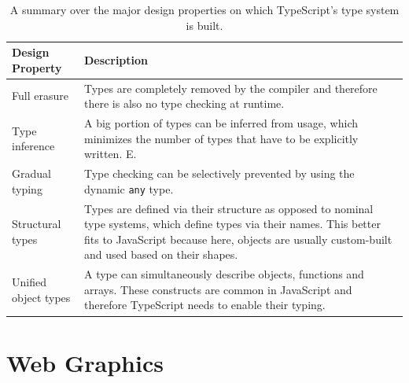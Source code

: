 \begin{table}[tp]
    \centering
    \begin{tabularx}{\linewidth}{| l | X |}
        \hline
        \textbf{Design Property} & \textbf{Description}                                                                                                                                                                                                        \\ \hline
        Full erasure             & Types are completely removed by the compiler and therefore there is also no type checking at runtime.                                                                                                                       \\ \hline
        Type inference           & A big portion of types can be inferred from usage, which minimizes the number of types that have to be explicitly written. E.                                                                                               \\ \hline
        Gradual typing           & Type checking can be selectively prevented by using the dynamic \lstinline{any} type.                                                                                                                                       \\ \hline
        Structural types         & Types are defined via their structure as opposed to nominal type systems, which define types via their names. This better fits to JavaScript because here, objects are usually custom-built and used based on their shapes. \\ \hline
        Unified object types     & A type can simultaneously describe objects, functions and arrays. These constructs are common in JavaScript and therefore TypeScript needs to enable their typing.                                                          \\ \hline
    \end{tabularx}
    \caption[TypeScript Type System Design Properties]
    {
        A summary over the major design properties on which TypeScript's type system is built.
    }
    \label{tab:TSTypeSystemDesignProperties}
\end{table}


\section{Web Graphics}

